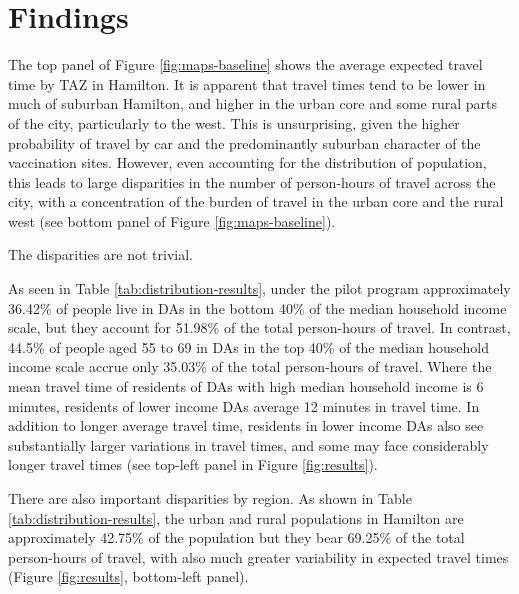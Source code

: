 \documentclass[]{elsarticle} %
\begin{document}
\hypertarget{findings}{%
\section{Findings}\label{findings}}

The top panel of Figure \ref{fig:maps-baseline} shows the average
expected travel time by TAZ in Hamilton. It is apparent that travel
times tend to be lower in much of suburban Hamilton, and higher in the
urban core and some rural parts of the city, particularly to the west.
This is unsurprising, given the higher probability of travel by car and
the predominantly suburban character of the vaccination sites. However,
even accounting for the distribution of population, this leads to large
disparities in the number of person-hours of travel across the city,
with a concentration of the burden of travel in the urban core and the
rural west (see bottom panel of Figure \ref{fig:maps-baseline}).

The disparities are not trivial.

As seen in Table \ref{tab:distribution-results}, under the pilot program
approximately 36.42\% of people live in DAs in the bottom 40\% of the
median household income scale, but they account for 51.98\% of the total
person-hours of travel. In contrast, 44.5\% of people aged 55 to 69 in
DAs in the top 40\% of the median household income scale accrue only
35.03\% of the total person-hours of travel. Where the mean travel time
of residents of DAs with high median household income is 6 minutes,
residents of lower income DAs average 12 minutes in travel time. In
addition to longer average travel time, residents in lower income DAs
also see substantially larger variations in travel times, and some may
face considerably longer travel times (see top-left panel in Figure
\ref{fig:results}).

There are also important disparities by region. As shown in Table
\ref{tab:distribution-results}, the urban and rural populations in
Hamilton are approximately 42.75\% of the population but they bear
69.25\% of the total person-hours of travel, with also much greater
variability in expected travel times (Figure \ref{fig:results},
bottom-left panel).
\end{document}
